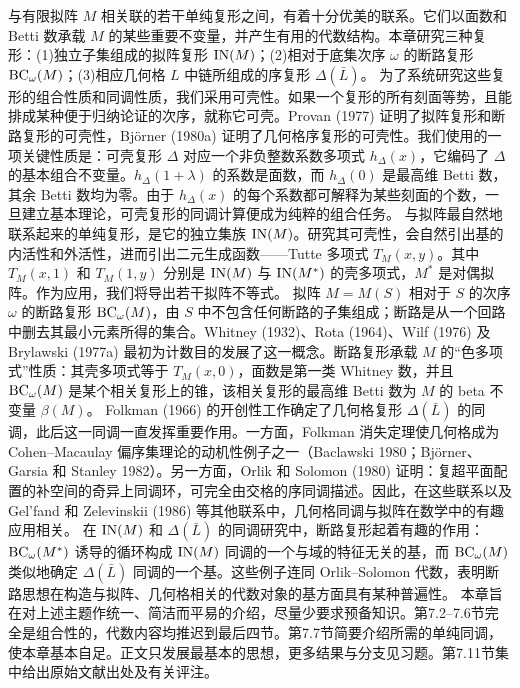 与有限拟阵 $M$ 相关联的若干单纯复形之间，有着十分优美的联系。它们以面数和 Betti 数承载 $M$ 的某些重要不变量，并产生有用的代数结构。本章研究三种复形：(1)独立子集组成的拟阵复形 $\operatorname{IN}(M)$；(2)相对于底集次序 $\omega$ 的断路复形 $\operatorname{BC}_\omega(M)$；(3)相应几何格 $L$ 中链所组成的序复形 $\Delta(\bar L)$。
为了系统研究这些复形的组合性质和同调性质，我们采用可壳性。如果一个复形的所有刻面等势，且能排成某种便于归纳论证的次序，就称它可壳。Provan (1977) 证明了拟阵复形和断路复形的可壳性，Björner (1980a) 证明了几何格序复形的可壳性。我们使用的一项关键性质是：可壳复形 $\Delta$ 对应一个非负整数系数多项式 $h_\Delta(x)$，它编码了 $\Delta$ 的基本组合不变量。$h_\Delta(1+\lambda)$ 的系数是面数，而 $h_\Delta(0)$ 是最高维 Betti 数，其余 Betti 数均为零。由于 $h_\Delta(x)$ 的每个系数都可解释为某些刻面的个数，一旦建立基本理论，可壳复形的同调计算便成为纯粹的组合任务。
与拟阵最自然地联系起来的单纯复形，是它的独立集族 $\operatorname{IN}(M)$。研究其可壳性，会自然引出基的内活性和外活性，进而引出二元生成函数——Tutte 多项式 $T_M(x,y)$。其中 $T_M(x,1)$ 和 $T_M(1,y)$ 分别是 $\operatorname{IN}(M)$ 与 $\operatorname{IN}(M^*)$ 的壳多项式，$M^*$ 是对偶拟阵。作为应用，我们将导出若干拟阵不等式。
拟阵 $M=M(S)$ 相对于 $S$ 的次序 $\omega$ 的断路复形 $\operatorname{BC}_\omega(M)$，由 $S$ 中不包含任何断路的子集组成；断路是从一个回路中删去其最小元素所得的集合。Whitney (1932)、Rota (1964)、Wilf (1976) 及 Brylawski (1977a) 最初为计数目的发展了这一概念。断路复形承载 $M$ 的“色多项式”性质：其壳多项式等于 $T_M(x,0)$，面数是第一类 Whitney 数，并且 $\operatorname{BC}_\omega(M)$ 是某个相关复形上的锥，该相关复形的最高维 Betti 数为 $M$ 的 beta 不变量 $\beta(M)$。
Folkman (1966) 的开创性工作确定了几何格复形 $\Delta(\bar L)$ 的同调，此后这一同调一直发挥重要作用。一方面，Folkman 消失定理使几何格成为 Cohen--Macaulay 偏序集理论的动机性例子之一（Baclawski 1980；Björner、Garsia 和 Stanley 1982）。另一方面，Orlik 和 Solomon (1980) 证明：复超平面配置的补空间的奇异上同调环，可完全由交格的序同调描述。因此，在这些联系以及 Gel'fand 和 Zelevinskii (1986) 等其他联系中，几何格同调与拟阵在数学中的有趣应用相关。
在 $\operatorname{IN}(M)$ 和 $\Delta(\bar L)$ 的同调研究中，断路复形起着有趣的作用：$\operatorname{BC}_\omega(M^*)$ 诱导的循环构成 $\operatorname{IN}(M)$ 同调的一个与域的特征无关的基，而 $\operatorname{BC}_\omega(M)$ 类似地确定 $\Delta(\bar L)$ 同调的一个基。这些例子连同 Orlik--Solomon 代数，表明断路思想在构造与拟阵、几何格相关的代数对象的基方面具有某种普遍性。
本章旨在对上述主题作统一、简洁而平易的介绍，尽量少要求预备知识。第7.2--7.6节完全是组合性的，代数内容均推迟到最后四节。第7.7节简要介绍所需的单纯同调，使本章基本自足。正文只发展最基本的思想，更多结果与分支见习题。第7.11节集中给出原始文献出处及有关评注。
